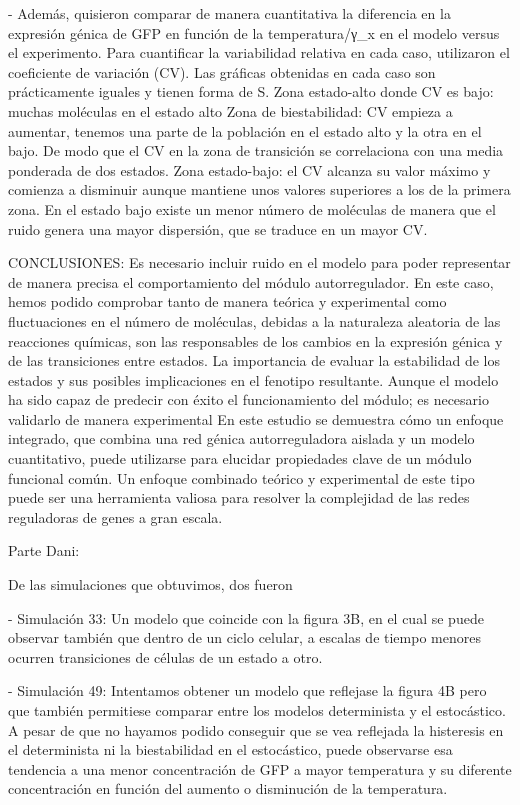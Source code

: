 - Además, quisieron comparar de manera cuantitativa la diferencia en la expresión génica de GFP en función de la temperatura/γ_x  en el modelo versus el experimento. Para cuantificar la variabilidad relativa en cada caso, utilizaron el coeficiente de variación (CV). Las gráficas obtenidas en cada caso son prácticamente iguales y tienen forma de S. 
	Zona estado-alto donde CV es bajo: muchas moléculas en el estado alto 
	Zona de biestabilidad: CV empieza a aumentar, tenemos una parte de la población en el estado alto y la otra en el bajo. De modo que el CV en la zona de transición se correlaciona con una media ponderada de dos estados.
	Zona estado-bajo: el CV alcanza su valor máximo y comienza a disminuir aunque mantiene unos valores superiores a los de la primera zona. En el estado bajo existe un menor número de moléculas de manera que el ruido genera una mayor dispersión, que se traduce en un mayor CV.
	
CONCLUSIONES:
	Es necesario incluir ruido en el modelo para poder representar de manera precisa el comportamiento del módulo autorregulador. En este caso, hemos podido comprobar tanto de manera teórica y experimental como fluctuaciones en el número de moléculas, debidas a la naturaleza aleatoria de las reacciones químicas, son las responsables de los cambios en la expresión génica y de las transiciones entre estados. 
	La importancia de evaluar la estabilidad de los estados y sus posibles implicaciones en el fenotipo resultante.
	Aunque el modelo ha sido capaz de predecir con éxito el funcionamiento del módulo; es necesario validarlo de manera experimental
	En este estudio se demuestra cómo un enfoque integrado, que combina una red génica autorreguladora aislada y un modelo cuantitativo, puede utilizarse para elucidar propiedades clave de un módulo funcional común. Un enfoque combinado teórico y experimental de este tipo puede ser una herramienta valiosa para resolver la complejidad de las redes reguladoras de genes a gran escala.

Parte Dani:

De las simulaciones que obtuvimos, dos fueron

- Simulación 33: Un modelo que coincide con la figura 3B, en el cual se puede observar también que dentro de un ciclo celular, a escalas de tiempo menores ocurren transiciones de células de un estado a otro.
	
- Simulación 49: Intentamos obtener un modelo que reflejase la figura 4B pero que también permitiese comparar entre los modelos determinista y el estocástico. A pesar de que no hayamos podido conseguir que se vea reflejada la histeresis en el determinista ni la biestabilidad en el estocástico, puede observarse esa tendencia a una menor concentración de GFP a mayor temperatura y su diferente concentración en función del aumento o disminución de la temperatura.
	


